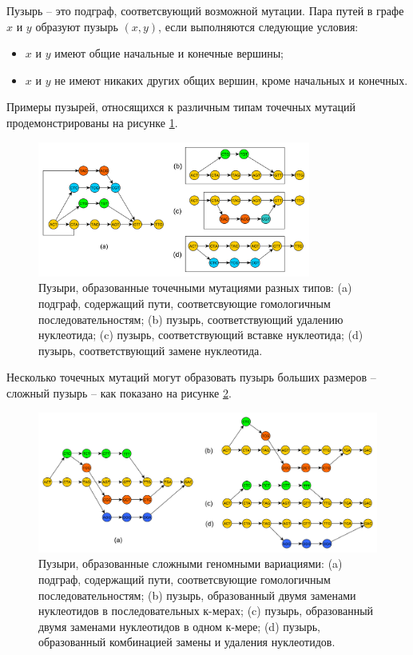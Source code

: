 Пузырь -- это подграф, соответсвующий возможной мутации\cite{18_minkin2020applications}. Пара путей в графе $ x $ и $ y $ образуют пузырь $ \left(x,y\right) $, если выполняются следующие условия:
\begin{itemize} 
	\item $ x $ и $ y $ имеют общие начальные и конечные вершины;
	\item $ x $ и $ y $ не имеют никаких других общих вершин, кроме начальных и конечных.
\end{itemize}

Примеры пузырей, относящихся к различным типам точечных мутаций продемонстрированы на рисунке \ref{fig:pm_ex}.
\begin{figure}[!th]
	\centering
	\includegraphics[width=0.8\textwidth]{img/pm_ex.pdf}
	\caption{Пузыри, образованные точечными мутациями разных типов: (a) подграф, содержащий пути, соответсвующие гомологичным последовательностям; (b) пузырь, соответствующий удалению нуклеотида; (c) пузырь, соответствующий вставке нуклеотида; (d) пузырь, соответствующий замене нуклеотида.}
	\label{fig:pm_ex}
\end{figure}

Несколько точечных мутаций могут образовать пузырь больших размеров -- сложный пузырь -- как показано на рисунке \ref{fig:cv_ex}. 
\begin{figure}[h!t]
	\centering
	\includegraphics[width=\textwidth]{img/cv_ex.pdf}
	\caption{Пузыри, образованные сложными геномными вариациями: (a) подграф, содержащий пути, соответсвующие гомологичным последовательностям; (b) пузырь, образованный двумя заменами нуклеотидов в последовательных к-мерах; (c) пузырь, образованный двумя заменами нуклеотидов в одном к-мере; (d) пузырь, образованный комбинацией замены и удаления нуклеотидов.}
	\label{fig:cv_ex}
\end{figure}

